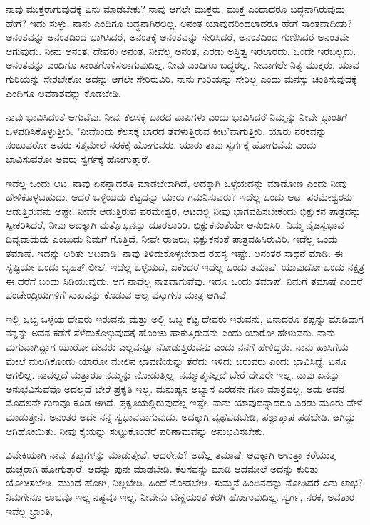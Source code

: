 ನಾವು ಮುಕ್ತರಾಗುವುದಕ್ಕೆ ಏನು ಮಾಡಬೇಕು? ನಾವು ಆಗಲೇ ಮುಕ್ತರು, ಮುಕ್ತ ಎಂದಾದರೂ ಬದ್ಧನಾಗಿರುವುದು ಹೇಗೆ? ಇದು ಸುಳ್ಳು. ನಾನು ಎಂದಿಗೂ ಬದ್ಧನಾಗಿರಲಿಲ್ಲ. ಅನಂತ ಯಾವುದರಿಂದಲಾದರೂ ಹೇಗೆ ಸಾಂತವಾದೀತು? ಅನಂತವನ್ನು ಅನಂತದಿಂದ ಭಾಗಿಸಿದರೆ, ಅನಂತಕ್ಕೆ ಅನಂತವನ್ನು ಸೇರಿಸಿದರೆ, ಅನಂತದಿಂದ ಗುಣಿಸಿದರೆ ಅನಂತವೇ ಆಗುವುದು. ನೀನು ಅನಂತ. ದೇವರು ಅನಂತ. ನೀವೆಲ್ಲ ಅನಂತ, ಎರಡು ಅಸ್ತಿತ್ವ ಇರಲಾರದು. ಒಂದೇ ಇರಬಲ್ಲದು. ಅನಂತವನ್ನು ಎಂದಿಗೂ ಸಾಂತಗೊಳಿಸಲಾಗುವುದಿಲ್ಲ. ನೀವು ಎಂದಿಗೂ ಬದ್ಧರಲ್ಲ. ನೀವಾಗಲೇ ನಿತ್ಯ ಮುಕ್ತರು, ಯಾವ ಗುರಿಯನ್ನು ಸೇರಬೇಕೋ ಅದನ್ನು ಆಗಲೇ ಸೇರಿರುವಿರಿ. ನಾನು ಗುರಿಯನ್ನು ಸೇರಿಲ್ಲ ಎಂದು ಮನಸ್ಸು ಚಿಂತಿಸುವುದಕ್ಕೆ ಎಂದಿಗೂ ಅವಕಾಶವನ್ನು ಕೊಡಬೇಡಿ.

ನಾವು ಭಾವಿಸಿದಂತೆ ಆಗುವೆವು. ನೀವು ಕೆಲಸಕ್ಕೆ ಬಾರದ ಪಾಪಿಗಳು ಎಂದು ಭಾವಿಸಿದರೆ ನಿಮ್ಮನ್ನು ನೀವೇ ಭ್ರಾಂತಿಗೆ ಒಳಪಡಿಸಿಕೊಳ್ಳುತ್ತೀರಿ. "ನೀವೊಂದು ಕೆಲಸಕ್ಕೆ ಬಾರದ ತೆವಳುತ್ತಿರುವ ಕೀಟ'ವಾಗುತ್ತೀರಿ. ಯಾರು ನರಕವನ್ನು ನಂಬುವರೋ ಅವರು ಸತ್ತಮೇಲೆ ನರಕಕ್ಕೆ ಹೋಗುವರು. ಯಾರು ತಾವು ಸ್ವರ್ಗಕ್ಕೆ ಹೋಗುವೆವು ಎಂದು ಭಾವಿಸುವರೋ ಅವರು ಸ್ವರ್ಗಕ್ಕೆ ಹೋಗುತ್ತಾರೆ.

ಇದೆಲ್ಲ ಒಂದು ಆಟ. ನಾವು ಏನನ್ನಾದರೂ ಮಾಡಬೇಕಾಗಿದೆ, ಅದಕ್ಕಾಗಿ ಒಳ್ಳೆಯದನ್ನು ಮಾಡೋಣ ಎಂದು ನೀವು ಹೇಳಿಕೊಳ್ಳಬಹುದು. ಆದರೆ ಒಳ್ಳೆಯದು ಕೆಟ್ಟದನ್ನು ಯಾರು ಗಮನಿಸುವರು? ಇದೆಲ್ಲ ಒಂದು ಆಟ. ಪರಮೇಶ್ವರನು ಆಡುತ್ತಿರುವನು ಅಷ್ಟೇ. ನೀವೇ ಆಡುತ್ತಿರುವ ಪರಮೇಶ್ವರ, ಆಟದಲ್ಲಿ ನೀವು ಭಾಗವಹಿಸಬೇಕೆಂದು ಭಿಕ್ಷುಕನ ಪಾತ್ರವನ್ನು ಸ್ವೀಕರಿಸಿದರೆ, ನೀವು ಅದಕ್ಕಾಗಿ ಮತ್ತೊಬ್ಬನನ್ನು ದೂರಲಾರಿರಿ. ಭಿಕ್ಷುಕನಂತೆಯೇ ಆನಂದಿಸಿರಿ. ನಿಮ್ಮ ನೈಜಸ್ವಭಾವ ದಿವ್ಯವಾದುದು ಎಂಬುದು ನಿಮಗೆ ಗೊತ್ತಿದೆ. ನೀವೇ ರಾಜರು; ಭಿಕ್ಷುಕನಂತೆ ಪಾತ್ರವಹಿಸಿರುವಿರಿ. ಇದೆಲ್ಲ ಒಂದು ತಮಾಷೆ. ಇದನ್ನು ಅರಿತು ಆಟವಾಡಿ. ನಾವು ತಿಳಿದುಕೊಳ್ಳಬೇಕಾದ ರಹಸ್ಯ ಇಷ್ಟೇ. ಅನಂತರ ಸಾಧನೆ ಮಾಡಿ. ಈ ಸೃಷ್ಟಿಯೇ ಒಂದು ಬೃಹತ್ ಲೀಲೆ. ಇದೆಲ್ಲ ಒಳ್ಳೆಯದೆ, ಏಕೆಂದರೆ ಇದೆಲ್ಲ ಒಂದು ತಮಾಷೆ. ಯಾವುದೋ ಒಂದು ನಕ್ಷತ್ರ ಈ ಧರೆಗೆ ಬಂದು ಸಿಡಿಯುವುದು. ಆಗ ನಾವೆಲ್ಲ ನಾಶವಾಗುವೆವು. ಇದೂ ಒಂದು ತಮಾಷೆ. ನಿಮಗೆ ತಮಾಷೆ ಎಂದರೆ ಪಂಚೇಂದ್ರಿಯಗಳಿಗೆ ಸುಖವನ್ನು ಕೊಡುವ ಅಲ್ಪ ವಸ್ತುಗಳು ಮಾತ್ರ ಆಗಿವೆ.

ಇಲ್ಲಿ ಒಬ್ಬ ಒಳ್ಳೆಯ ದೇವರು ಇರುವನು ಮತ್ತು ಅಲ್ಲಿ ಒಬ್ಬ ಕೆಟ್ಟ ದೇವರು ಇರುವನು, ಏನಾದರೂ ತಪ್ಪನ್ನು ಮಾಡಿದಾಗ ನನ್ನನ್ನು ಅವನ ಕಡೆಗೆ ಸೆಳೆದುಕೊಳ್ಳುವುದಕ್ಕೆ ಹೊಂಚು ಹಾಕುತ್ತಿರುವನು ಎಂದು ಯಾರೋ ಹೇಳುವರು. ನಾನು ಮಗುವಾಗಿದ್ದಾಗ ಯಾರೋ ದೇವರು ಎಲ್ಲವನ್ನೂ ನೋಡುತ್ತಿರುವನು ಎಂದು ನನಗೆ ಹೇಳಿದ್ದರು. ನಾನು ಹಾಸಿಗೆಯ ಮೇಲೆ ಮಲಗಿಕೊಂಡು ಯಾರೋ ಮೇಲಿನ ಛಾವಣಿಯನ್ನು ತೆರೆದು ಇಳಿದು ಬರುವರು ಎಂದು ಭಾವಿಸಿದ್ದೆ. ಏನೂ ಆಗಲಿಲ್ಲ. ನಾವಲ್ಲದೆ ಮತ್ತಾರೂ ನಮ್ಮನ್ನು ನೋಡುತ್ತಿಲ್ಲ. ನಮ್ಮಾತ್ಮನಲ್ಲದೆ ಬೇರೆ ದೇವರೇ ಇಲ್ಲ. ನಾವು ಏನನ್ನು ಅನುಭವಿಸುವೆವೊ ಅದಲ್ಲದೆ ಬೇರೆ ಪ್ರಕೃತಿ ಇಲ್ಲ. ಮನುಷ್ಯನ ಅಭ್ಯಾಸ ಎರಡನೇ ಗುಣ ಮಾತ್ರವಲ್ಲ, ಅದು ಅವನ ಮೊದಲನೇ ಗುಣವೂ ಕೂಡ ಆಗಿದೆ. ಪ್ರಕೃತಿಯಲ್ಲಿರುವುದೆಲ್ಲ ಇಷ್ಟೇ. ನಾನು ಯಾವುದನ್ನಾದರೂ ಎರಡು ಮೂರು ವೇಳೆ ಮಾಡುತ್ತೇನೆ. ಅನಂತರ ಅದೇ ನನ್ನ ಸ್ವಭಾವವಾಗುವುದು. ಅದಕ್ಕಾಗಿ ವ್ಯಥೆಪಡಬೇಡಿ, ಪಶ್ಚಾತ್ತಾಪ ಪಡಬೇಡಿ. ಆಗಿದ್ದು ಆಗಿಹೋಯಿತು. ನೀವು ಕೈಯನ್ನು ಸುಟ್ಟುಕೊಂಡರೆ ಪರಿಣಾಮವನ್ನು ಅನುಭವಿಸಬೇಕು.

ವಿವೇಕಿಯಾಗಿ ನಾವು ತಪ್ಪುಗಳನ್ನು ಮಾಡುತ್ತೇವೆ. ಆದರೇನು? ಅದೆಲ್ಲ ತಮಾಷೆ. ಅದಕ್ಕಾಗಿ ಅಳುತ್ತಾ ಕರೆಯುತ್ತ ಹುಚ್ಚರಾಗಿ ಹೋಗುತ್ತಾರೆ. ಅದನ್ನು ಪುನಃ ಮಾಡಬೇಡಿ. ಕೆಲಸವನ್ನು ಮಾಡಿ ಆದಮೇಲೆ ಅದನ್ನು ಕುರಿತು ಯೋಚಿಸಬೇಡಿ. ಮುಂದೆ ಹೋಗಿ, ನಿಲ್ಲಬೇಡಿ. ಹಿಂದೆ ನೋಡಬೇಡಿ. ಸುಮ್ಮನೆ ಹಿಂದಿನದನ್ನು ನೋಡಿದರೆ ಏನು ಲಾಭ? ನಿಮಗೇನೂ ಲಾಭವೂ ಇಲ್ಲ ನಷ್ಟವೂ ಇಲ್ಲ. ನೀವೇನು ಬೆಣ್ಣೆಯಂತೆ ಕರಗಿ ಹೋಗುವುದಿಲ್ಲ. ಸ್ವರ್ಗ, ನರಕ, ಅವತಾರ ಇವೆಲ್ಲ ಭ್ರಾಂತಿ,


